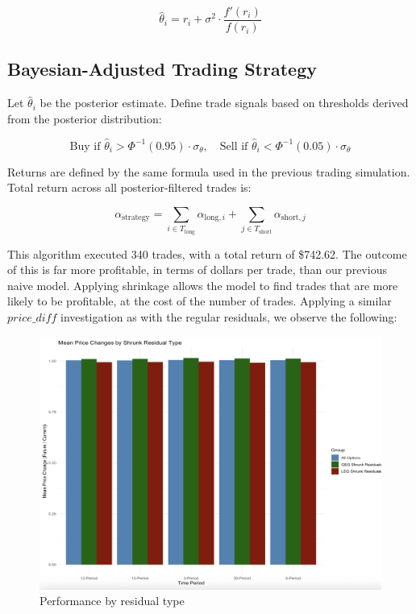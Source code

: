 \documentclass{article}
\begin{document}
\[
\hat{\theta}_i = r_i + \sigma^2 \cdot \frac{f'(r_i)}{f(r_i)}
\]

\subsection{Bayesian-Adjusted Trading Strategy}

Let \( \hat{\theta}_i \) be the posterior estimate. Define trade signals based on thresholds derived from the posterior distribution:

\[
\text{Buy if } \hat{\theta}_i > \Phi^{-1}(0.95) \cdot \sigma_\theta, \quad
\text{Sell if } \hat{\theta}_i < \Phi^{-1}(0.05) \cdot \sigma_\theta
\]

Returns are defined by the same formula used in the previous trading simulation. Total return across all posterior-filtered trades is:

\[
\alpha_{\text{strategy}} = \sum_{i \in T_{\text{long}}} \alpha_{\text{long}, i} + \sum_{j \in T_{\text{short}}} \alpha_{\text{short}, j}
\]

This algorithm executed 340 trades, with a total return of \$742.62. The outcome of this is far more profitable, in terms of dollars per trade, than our previous naive model. Applying shrinkage allows the model to find trades that are more likely to be profitable, at the cost of the number of trades. Applying a similar $price\_diff$ investigation as with the regular residuals, we observe the following:

\begin{figure}[h]
  \centering
  \includegraphics[width=1\linewidth]{data/results/shrinkage_results.png}
  \caption{Performance by residual type}
  \label{fig:shrunk}
\end{figure}
\end{document}
